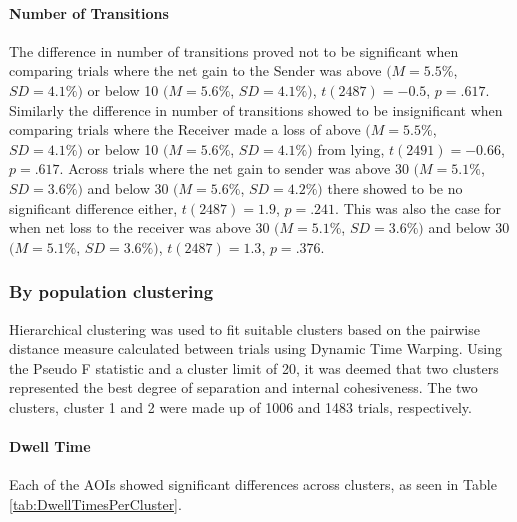 \documentclass[man, floatsintext]{apa7}
\begin{document}
\paragraph{Number of Transitions}
The difference in number of transitions proved not to be significant when comparing trials where the net gain to the Sender was above $(M = 5.5\%$, $SD = 4.1\%)$ or below 10 $(M = 5.6\%$, $SD = 4.1\%)$, $t(2487)=-0.5$, $p=.617$.
Similarly the difference in number of transitions showed to be insignificant when comparing trials where the Receiver made a loss of above $(M = 5.5\%$, $SD = 4.1\%)$  or below 10 $(M = 5.6\%$, $SD = 4.1\%)$ from lying, $t(2491)=-0.66$, $p=.617$. Across trials where the net gain to sender was above 30 $(M = 5.1\%$, $SD = 3.6\%)$ and below 30 $(M = 5.6\%$, $SD = 4.2\%)$ there showed to be no significant difference either, $t(2487)=1.9$, $p=.241$. This was also the case for when net loss to the receiver was above 30 $(M = 5.1\%$, $SD = 3.6\%)$ and below 30 $(M = 5.1\%$, $SD = 3.6\%)$, $t(2487)=1.3$, $p=.376$.

\subsubsection{By population clustering}
Hierarchical clustering was used to fit suitable clusters based on the pairwise distance measure calculated between trials using Dynamic Time Warping. Using the Pseudo F statistic and a cluster limit of 20, it was deemed that two clusters represented the best degree of separation and internal cohesiveness. The two clusters, cluster 1 and 2 were made up of 1006 and 1483 trials, respectively.


\paragraph{Dwell Time}
Each of the AOIs showed significant differences across clusters, as seen in Table \ref{tab:DwellTimesPerCluster}.
\end{document}
